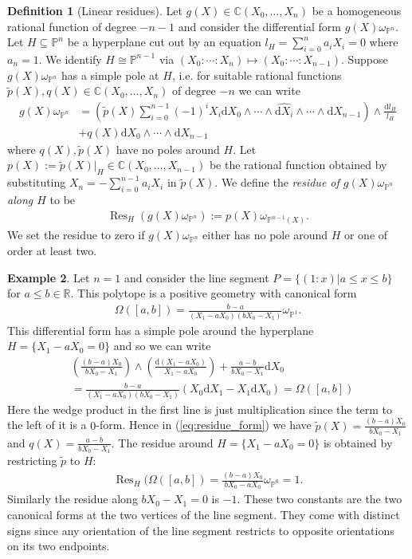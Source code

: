 \documentclass[a4paper,10pt]{amsart}
\theoremstyle{definition}
\newtheorem{defin}{Definition}[section]
\newtheorem{ex}[defin]{Example}
\theoremstyle{plain}
\newcommand{\Res}{\operatorname{Res}}
\newcommand{\dd}{\text{d}}
\newcommand{\C}{{\mathbb C}}
\newcommand{\R}{{\mathbb R}}
\newcommand{\pp}{\mathbb{P}}
\begin{document}
\begin{defin}[Linear residues]
    \label{def:residue}
    Let $g(X)\in \C(X_0,\ldots,X_n)$ be a homogeneous rational function of degree $-n-1$ and consider the differential form $g(X)\omega_{\pp^n}$. Let $H\subseteq \pp^n$ be a hyperplane cut out by an equation $l_H=\sum_{i=0}^na_iX_i=0$ where $a_n=1$. We identify $H\cong \pp^{n-1}$ via $(X_0:\cdots:X_n)\mapsto (X_0:\cdots:X_{n-1})$. Suppose $g(X)\omega_{\pp^n}$ has a simple pole at $H$, i.e. for suitable rational functions $\widetilde{p}(X), q(X)\in \C(X_0,\ldots,X_n)$ of degree $-n$ we can write \begin{align}
    \label{eq:residue_form}
        g(X)\omega_{\pp^n}&= \left(\widetilde{p}(X)\sum_{i=0}^{n-1}(-1)^iX_i\dd X_0\wedge \cdots \wedge \widehat{\dd X_i}\wedge \cdots \wedge \dd X_{n-1}\right)\wedge \frac{\dd l_H}{l_H}\\& \nonumber+ q(X)\dd X_0\wedge \cdots \wedge \dd X_{n-1}
    \end{align}
    where $q(X),\widetilde{p}(X)$ have no poles around $H$.
    Let $p(X):=\widetilde{p}(X)|_H\in \C(X_0,\ldots,X_{n-1})$ be the rational function obtained by substituting $X_n=-\sum_{i=0}^{n-1}a_iX_i$ in $\widetilde{p}(X)$. We define the \emph{residue of $g(X)\omega_{\pp^n}$ along $H$} to be \begin{align*}
        \Res_H(g(X)\omega_{\pp^n}):=p(X)\omega_{\pp^{n-1}(X)}.
    \end{align*}
    We set the residue to zero if $g(X)\omega_{\pp^n}$ either has no pole around $H$ or one of order at least two.
\end{defin}
\begin{ex}
    Let $n=1$ and consider the line segment $P=\{(1:x)| a\leq x \leq b\}$ for $a\leq b\in \R$. This polytope is a positive geometry with canonical form \begin{align*}
        \Omega([a,b])=\frac{b-a}{(X_1-aX_0)(bX_0-X_1)}\omega_{\pp^1}.
    \end{align*}
    This differential form has a simple pole around the hyperplane $H=\{X_1-aX_0=0\}$ and so we can write \begin{align*}
        &\left(\frac{(b-a)X_0}{bX_0-X_1}\right)\wedge\left( \frac{\dd (X_1-aX_0)}{X_1-aX_0}\right)+ \frac{a-b}{bX_0-X_1}\dd X_0\\ &= \frac{b-a}{(X_1-aX_0)(bX_0-X_1)}(X_0\dd X_1-X_1\dd X_0)= \Omega([a,b]) 
    \end{align*}
    Here the wedge product in the first line is just multiplication since the term to the left of it is a $0$-form. Hence in (\ref{eq:residue_form}) we have $\widetilde{p}(X)=\frac{(b-a)X_0}{bX_0-X_1}$ and $q(X)=\frac{a-b}{bX_0-X_1}$. The residue around $H=\{X_1-aX_0=0\}$ is obtained by restricting $\widetilde{p}$ to $H$: \begin{align*}
        \Res_H(\Omega([a,b])= \frac{(b-a)X_0}{bX_0-aX_0}\omega_{\pp^0}= 1.
    \end{align*}
    Similarly the residue along $bX_0-X_1=0$ is $-1$. These two constants are the two canonical forms at the two vertices of the line segment. They come with distinct signs since any orientation of the line segment restricts to opposite orientations on its two endpoints.
\end{ex}
\end{document}
